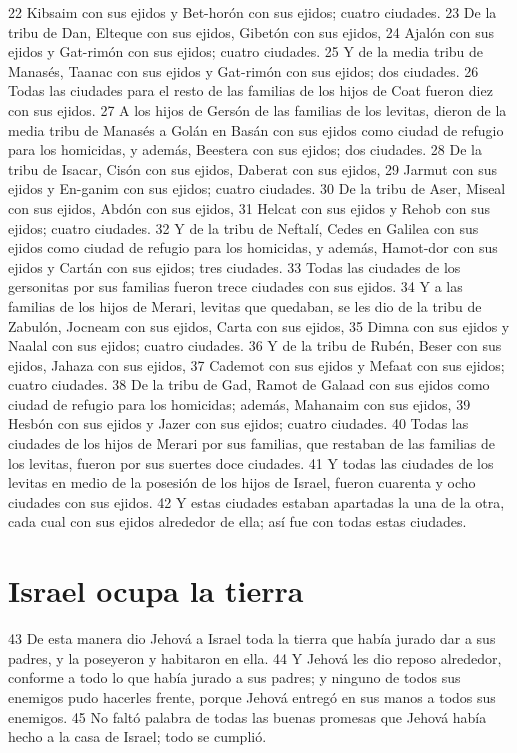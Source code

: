 22 Kibsaim con sus ejidos y Bet-horón con sus ejidos; cuatro ciudades.
23 De la tribu de Dan, Elteque con sus ejidos, Gibetón con sus ejidos,
24 Ajalón con sus ejidos y Gat-rimón con sus ejidos; cuatro ciudades.
25 Y de la media tribu de Manasés, Taanac con sus ejidos y Gat-rimón con sus ejidos; dos ciudades.
26 Todas las ciudades para el resto de las familias de los hijos de Coat fueron diez con sus ejidos.
27 A los hijos de Gersón de las familias de los levitas, dieron de la media tribu de Manasés a Golán en Basán con sus ejidos como ciudad de refugio para los homicidas, y además, Beestera con sus ejidos; dos ciudades.
28 De la tribu de Isacar, Cisón con sus ejidos, Daberat con sus ejidos,
29 Jarmut con sus ejidos y En-ganim con sus ejidos; cuatro ciudades.
30 De la tribu de Aser, Miseal con sus ejidos, Abdón con sus ejidos,
31 Helcat con sus ejidos y Rehob con sus ejidos; cuatro ciudades.
32 Y de la tribu de Neftalí, Cedes en Galilea con sus ejidos como ciudad de refugio para los homicidas, y además, Hamot-dor con sus ejidos y Cartán con sus ejidos; tres ciudades.
33 Todas las ciudades de los gersonitas por sus familias fueron trece ciudades con sus ejidos.
34 Y a las familias de los hijos de Merari, levitas que quedaban, se les dio de la tribu de Zabulón, Jocneam con sus ejidos, Carta con sus ejidos,
35 Dimna con sus ejidos y Naalal con sus ejidos; cuatro ciudades.
36 Y de la tribu de Rubén, Beser con sus ejidos, Jahaza con sus ejidos,
37 Cademot con sus ejidos y Mefaat con sus ejidos; cuatro ciudades.
38 De la tribu de Gad, Ramot de Galaad con sus ejidos como ciudad de refugio para los homicidas; además, Mahanaim con sus ejidos, 
39 Hesbón con sus ejidos y Jazer con sus ejidos; cuatro ciudades.
40 Todas las ciudades de los hijos de Merari por sus familias, que restaban de las familias de los levitas, fueron por sus suertes doce ciudades.
41 Y todas las ciudades de los levitas en medio de la posesión de los hijos de Israel, fueron cuarenta y ocho ciudades con sus ejidos.
42 Y estas ciudades estaban apartadas la una de la otra, cada cual con sus ejidos alrededor de ella; así fue con todas estas ciudades.
\section*{Israel ocupa la tierra}

43 De esta manera dio Jehová a Israel toda la tierra que había jurado dar a sus padres, y la poseyeron y habitaron en ella.
44 Y Jehová les dio reposo alrededor, conforme a todo lo que había jurado a sus padres; y ninguno de todos sus enemigos pudo hacerles frente, porque Jehová entregó en sus manos a todos sus enemigos.
45 No faltó palabra de todas las buenas promesas que Jehová había hecho a la casa de Israel; todo se cumplió.

